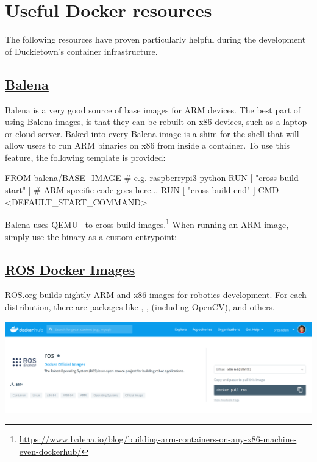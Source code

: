 \section{Useful Docker resources}

The following resources have proven particularly helpful during the development of Duckietown's container infrastructure.

\subsection{\href{https://www.balena.io/}{Balena}}\label{subsec:balena}

Balena is a very good source of base images for ARM devices. The best part of using Balena images, is that they can be rebuilt on x86 devices, such as a laptop or cloud server. Baked into every Balena image is a shim for the shell that will allow users to run ARM binaries on x86 from inside a container. To use this feature, the following  template is provided:
%
\begin{dockerlisting}
FROM balena/BASE_IMAGE # e.g. raspberrypi3-python
RUN [ "cross-build-start" ]
# ARM-specific code goes here...
RUN [ "cross-build-end" ]
CMD <DEFAULT_START_COMMAND>
\end{dockerlisting}
%
Balena uses \href{https://www.qemu.org/}{QEMU}~\citep{bellard2005qemu} to cross-build images.\hspace{-.08em}\footnote{\url{https://www.balena.io/blog/building-arm-containers-on-any-x86-machine-even-dockerhub/}} When running an ARM image, simply use the  binary as a custom entrypoint:
%

\subsection{\href{https://hub.docker.com/_/ros}{ROS Docker Images}}

ROS.org builds nightly ARM and x86 images for robotics development. For each distribution, there are packages like , ,  (including \href{https://opencv.org/}{OpenCV}),  and others.\vspace{10pt}
%
\begin{centering}
\includegraphics[width=\textwidth]{../figures/ros_docker_images.png}
\end{centering}


